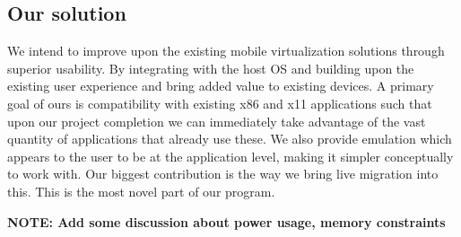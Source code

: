 \subsection{Our solution}
We intend to improve upon the existing mobile virtualization solutions through superior usability.  By integrating with the host OS and building upon the existing user experience and bring added value to existing devices.
A primary goal of ours is compatibility with existing x86 and x11 applications such that upon our project completion we can immediately take advantage of the vast quantity of applications that already use these.
We also provide emulation which appears to the user to be at the application level, making it simpler conceptually to work with.
Our biggest contribution is the way we bring live migration into this.  This is the most novel part of our program.

{\bf NOTE: Add some discussion about power usage, memory constraints \newline}
